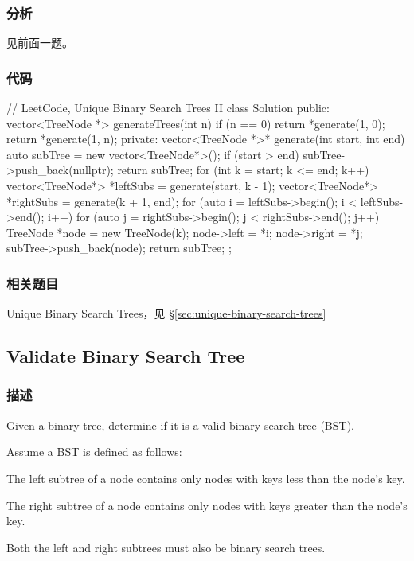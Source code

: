 \subsubsection{分析}
见前面一题。


\subsubsection{代码}

\begin{Code}
// LeetCode, Unique Binary Search Trees II
class Solution {
public:
    vector<TreeNode *> generateTrees(int n) {
        if (n == 0)
            return *generate(1, 0);
        return *generate(1, n);
    }
private:
    vector<TreeNode *>* generate(int start, int end) {
        auto subTree = new vector<TreeNode*>();
        if (start > end) {
            subTree->push_back(nullptr);
            return subTree;
        }
        for (int k = start; k <= end; k++) {
            vector<TreeNode*> *leftSubs = generate(start, k - 1);
            vector<TreeNode*> *rightSubs = generate(k + 1, end);
            for (auto i = leftSubs->begin(); i < leftSubs->end(); i++) {
                for (auto j = rightSubs->begin(); j < rightSubs->end(); j++) {
                    TreeNode *node = new TreeNode(k);
                    node->left = *i;
                    node->right = *j;
                    subTree->push_back(node);
                }
            }
        }
        return subTree;
    }
};
\end{Code}


\subsubsection{相关题目}
\begindot
\item Unique Binary Search Trees，见 \S \ref{sec:unique-binary-search-trees}
\myenddot


\subsection{Validate Binary Search Tree}
\label{sec:validate-binary-search-tree}


\subsubsection{描述}
Given a binary tree, determine if it is a valid binary search tree (BST).

Assume a BST is defined as follows:
\begindot
\item The left subtree of a node contains only nodes with keys less than the node's key.
\item The right subtree of a node contains only nodes with keys greater than the node's key.
\item Both the left and right subtrees must also be binary search trees.
\myenddot


